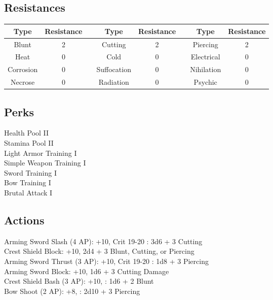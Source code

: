 \subsection{Resistances}
\begin{minipage}[H]{1\textwidth}
	\centering
	\begin{tabular}[c]{|c | c | c | c | c | c | c | c|}
		\hline
		Type & Resistance && Type & Resistance && Type & Resistance\\
		\hline
		Blunt & 2 &&
		Cutting & 2 &&
		Piercing & 2\\
		Heat & 0 &&
		Cold & 0 &&
		Electrical & 0\\
		Corrosion & 0 &&
		Suffocation & 0 &&
		Nihilation & 0 \\
		Necrose & 0 &&
		Radiation & 0 &&
		Psychic & 0\\
		\hline
	\end{tabular}
\end{minipage}

\subsection{Perks}
Health Pool II\\
Stamina Pool II\\
Light Armor Training I\\
Simple Weapon Training I\\
Sword Training I\\
Bow Training I\\
Brutal Attack I\\

\subsection{Actions}
Arming Sword Slash (4 AP): +10, Crit 19-20 : 3d6 + 3 Cutting\\

Crest Shield Block: +10, 2d4 + 3 Blunt, Cutting, or Piercing\\

Arming Sword Thrust (3 AP): +10, Crit 19-20 : 1d8 + 3 Piercing\\

Arming Sword Block: +10, 1d6 + 3 Cutting Damage\\

Crest Shield Bash (3 AP): +10, : 1d6 + 2 Blunt\\

Bow Shoot (2 AP): +8, : 2d10 + 3 Piercing\\

